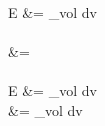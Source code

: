 E &=  \int_{vol}  \cdot {} dv \, \\ \\
&= \\ \\
E &=  \int_{vol}  \cdot {} dv \\
&=  \int_{vol}  dv \\